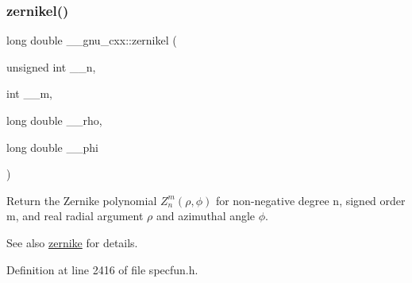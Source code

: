 \subsubsection{\texorpdfstring{zernikel()}{zernikel()}}
{\footnotesize\ttfamily long double \+\_\+\+\_\+gnu\+\_\+cxx\+::zernikel (\begin{DoxyParamCaption}\item[{unsigned int}]{\+\_\+\+\_\+n,  }\item[{int}]{\+\_\+\+\_\+m,  }\item[{long double}]{\+\_\+\+\_\+rho,  }\item[{long double}]{\+\_\+\+\_\+phi }\end{DoxyParamCaption})\hspace{0.3cm}{\ttfamily [inline]}}

Return the Zernike polynomial $ Z_n^m(\rho,\phi) $ for non-\/negative degree {\ttfamily n}, signed order {\ttfamily m}, and real radial argument $ \rho $ and azimuthal angle $ \phi $.

\begin{DoxySeeAlso}{See also}
\hyperlink{group__mathsf__gnu_gaaed33f29c1eb1d2c5b9590fe2e57151c}{zernike} for details. 
\end{DoxySeeAlso}


Definition at line 2416 of file specfun.\+h.

